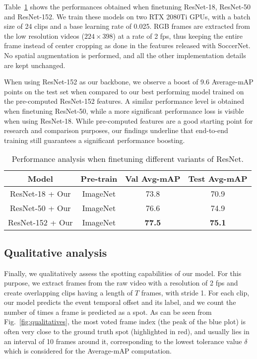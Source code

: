 \documentclass[a4paper,conference]{IEEEtran}
\begin{document}
Table~\ref{tab:e2e} shows the performances obtained when finetuning ResNet-18, ResNet-50 and ResNet-152. We train these models on two RTX 2080Ti GPUs, with a batch size of 24 clips and a base learning rate of 0.025. RGB frames are extracted from the low resolution videos ($224 \times 398$) at a rate of 2 fps, thus keeping the entire frame instead of center cropping as done in the features released with SoccerNet. No spatial augmentation is performed, and all the other implementation details are kept unchanged.

When using ResNet-152 as our backbone, we observe a boost of 9.6 Average-mAP points on the test set when compared to our best performing model trained on the pre-computed ResNet-152 features. A similar performance level is obtained when finetuning ResNet-50, while a more significant performance loss is visible when using ResNet-18. While pre-computed features are a good starting point for research and comparison purposes, our findings underline that end-to-end training still guarantees a significant performance boosting.

\begin{table}[t]
\centering
\caption{Performance analysis when finetuning different variants of ResNet.}
\begin{tabular}{cccc}
    \toprule 
    Model & Pre-train & Val Avg-mAP & Test Avg-mAP \\
    \midrule
    ResNet-18 + Our & ImageNet & 73.8 & 70.9 \\
    ResNet-50 + Our & ImageNet & 76.6 & 74.9 \\
    ResNet-152 + Our & ImageNet & \textbf{77.5} & \textbf{75.1} \\
    \bottomrule
\end{tabular}
\label{tab:e2e}
\end{table}


\subsection{Qualitative analysis}
Finally, we qualitatively assess the spotting capabilities of our model. For this purpose, we extract frames from the raw video with a resolution of 2 fps and create overlapping clips having a length of $T$ frames, with stride 1.
For each clip, our model predicts the event temporal offset and its label, and we count the number of times a frame is predicted as a spot. As can be seen from Fig.~\ref{fig:qualitatives}, the most voted frame index (the peak of the blue plot) is often very close to the ground truth spot (highlighted in red), and usually lies in an interval of 10 frames around it, corresponding to the lowest tolerance value $\delta$ which is considered for the Average-mAP computation.
\end{document}
